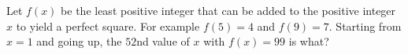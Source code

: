 Let $f(x)$ be the least positive integer that can be added to the positive integer $x$ to yield a perfect square. For example $f(5)=4$ and $f(9)=7$. Starting from $x=1$ and going up, the $52$nd value of $x$ with $f(x)=99$ is what?
